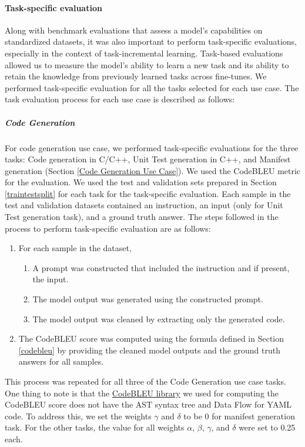 \paragraph{Task-specific evaluation}
Along with benchmark evaluations that assess a model’s capabilities on standardized datasets, it was also important to perform task-specific evaluations, especially in the context of task-incremental learning. Task-based evaluations allowed us to measure the model’s ability to learn a new task and its ability to retain the knowledge from previously learned tasks across fine-tunes. We performed task-specific evaluation for all the tasks selected for each use case. The task evaluation process for each use case is described as follows:

\subparagraph{Code Generation}
For code generation use case, we performed task-specific evaluations for the three tasks: Code generation in C/C++, Unit Test generation in C++, and Manifest generation (Section \ref{Code Generation Use Case}). We used the CodeBLEU metric for the evaluation. We used the test and validation sets prepared in Section \ref{traintestsplit} for each task for the task-specific evaluation. Each sample in the test and validation datasets contained an instruction, an input (only for Unit Test generation task), and a ground truth answer. 
The steps followed in the process to perform task-specific evaluation are as follows:
\begin{enumerate}
\item For each sample in the dataset,
\begin{enumerate} [label*=\arabic*.]
\item A prompt was constructed that included the instruction and if present, the input.
\item The model output was generated using the constructed prompt.
\item The model output was cleaned by extracting only the generated code.
\end{enumerate}
\item The CodeBLEU score was computed using the formula defined in Section \ref{codebleu} by providing the cleaned model outputs and the ground truth answers for all samples.
\end{enumerate}

This process was repeated for all three of the Code Generation use case tasks. One thing to note is that the \href{https://github.com/k4black/codebleu/tree/f9bfd319b2fca3d731b6e7203764f7078c6bc5f4}{CodeBLEU library} we used for computing the CodeBLEU score does not have the AST syntax tree and Data Flow for YAML code. To address this, we set the weights $\gamma$ and $\delta$ to be 0 for manifest generation task. For the other tasks, the value for all weights $\alpha$, $\beta$, $\gamma$, and $\delta$ were set to 0.25 each.

